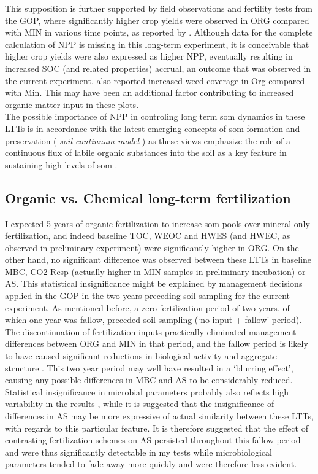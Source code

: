 	This supposition is further supported by field observations and fertility tests from the GOP, where significantly higher crop yields were observed in ORG compared with MIN in various time points, as reported by \citet{bartal2018}. Although data for the complete calculation of NPP is missing in this long-term experiment, it is conceivable that higher crop yields were also expressed as higher NPP, eventually resulting in increased SOC (and related properties) accrual, an outcome that was observed in the current experiment. \citeauthor{bartal2018} also reported increased weed coverage in Org compared with Min. This may have been an additional factor contributing to increased organic matter input in these plots.\\
	The possible importance of NPP in controling long term \gls{som} dynamics in these LTTs is in accordance with the latest emerging concepts of \gls{som} formation and preservation (\textit{ soil continuum model} ) as these views emphasize the role of a continuous flux of labile organic substances into the soil as a key feature in sustaining high levels of \gls{som} \citep{kleber2010, lehmann2015}.

	\subsection{Organic vs. Chemical long-term fertilization}
	I expected 5 years of organic fertilization to increase \gls{som} pools over mineral-only fertilization, and indeed baseline TOC, WEOC and HWES (and HWEC, as observed in preliminary experiment) were significantly higher in ORG. On the other hand, no significant difference was observed between these LTTs in baseline MBC, CO2-Resp (actually higher in MIN samples in preliminary incubation) or AS. This statistical insignificance might be explained by management decisions applied in the GOP in the two years preceding soil sampling for the current experiment. As mentioned before, a zero fertilization period of two years, of which one year was fallow, preceded soil sampling (‘no input + fallow' period). The discontinuation of fertilization inputs practically eliminated management differences between ORG and MIN in that period, and the fallow period is likely to have caused significant reductions in biological activity and aggregate structure \citep{redmile-gordon2020, golchin1994}. This two year period may well have resulted in a ‘blurring effect’, causing any possible differences in MBC and AS to be considerably reduced.
	Statistical insignificance in microbial parameters probably also reflects high variability in the results , while it is suggested that the insignificance of differences in AS may be more expressive of actual similarity between these LTTs, with regards to this particular feature.
	It is therefore suggested that the effect of contrasting fertilization schemes on AS persisted throughout this fallow period and were thus significantly detectable  in my tests while microbiological parameters tended to fade away more quickly and were therefore less evident.

